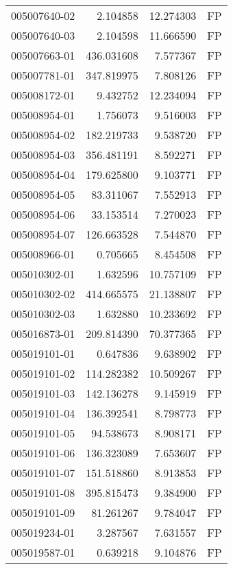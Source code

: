 \begin{tabular}{lrrl}
005007640-02 &    2.104858 &      12.274303 &   FP \\
005007640-03 &    2.104598 &      11.666590 &   FP \\
005007663-01 &  436.031608 &       7.577367 &   FP \\
005007781-01 &  347.819975 &       7.808126 &   FP \\
005008172-01 &    9.432752 &      12.234094 &   FP \\
005008954-01 &    1.756073 &       9.516003 &   FP \\
005008954-02 &  182.219733 &       9.538720 &   FP \\
005008954-03 &  356.481191 &       8.592271 &   FP \\
005008954-04 &  179.625800 &       9.103771 &   FP \\
005008954-05 &   83.311067 &       7.552913 &   FP \\
005008954-06 &   33.153514 &       7.270023 &   FP \\
005008954-07 &  126.663528 &       7.544870 &   FP \\
005008966-01 &    0.705665 &       8.454508 &   FP \\
005010302-01 &    1.632596 &      10.757109 &   FP \\
005010302-02 &  414.665575 &      21.138807 &   FP \\
005010302-03 &    1.632880 &      10.233692 &   FP \\
005016873-01 &  209.814390 &      70.377365 &   FP \\
005019101-01 &    0.647836 &       9.638902 &   FP \\
005019101-02 &  114.282382 &      10.509267 &   FP \\
005019101-03 &  142.136278 &       9.145919 &   FP \\
005019101-04 &  136.392541 &       8.798773 &   FP \\
005019101-05 &   94.538673 &       8.908171 &   FP \\
005019101-06 &  136.323089 &       7.653607 &   FP \\
005019101-07 &  151.518860 &       8.913853 &   FP \\
005019101-08 &  395.815473 &       9.384900 &   FP \\
005019101-09 &   81.261267 &       9.784047 &   FP \\
005019234-01 &    3.287567 &       7.631557 &   FP \\
005019587-01 &    0.639218 &       9.104876 &   FP \\

\end{tabular}
